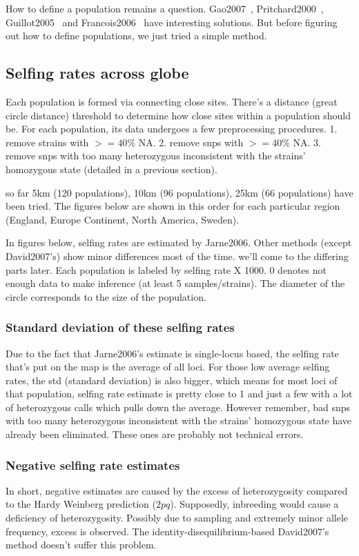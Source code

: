 \documentclass[a4paper,10pt]{article}
\begin{document}
How to define a population remains a question. Gao2007~\cite{Gao2007}, Pritchard2000~\cite{Pritchard2000}, Guillot2005~\cite{Guillot2005} and Francois2006~\cite{Francois2006} have interesting solutions. But before figuring out how to define populations, we just tried a simple method.

\subsection{Selfing rates across globe}
Each population is formed via connecting close sites. There's a distance (great circle distance) threshold to determine how close sites within a population should be. For each population, its data undergoes a few preprocessing procedures. 1. remove strains with $>=40\%$ NA. 2. remove snps with $>=40\%$ NA. 3. remove snps with too many heterozygous inconsistent with the strains' homozygous state (detailed in a previous section).

so far 5km (120 populations), 10km (96 populations), 25km (66 populations) have been tried. The figures below are shown in this order for each particular region (England, Europe Continent, North America, Sweden).

In figures below, selfing rates are estimated by Jarne2006. Other methods (except David2007's) show minor differences most of the time. we'll come to the differing parts later. Each population is labeled by selfing rate X 1000. 0 denotes not enough data to make inference (at least 5 samples/strains). The diameter of the circle corresponds to the size of the population.

\subsubsection{Standard deviation of these selfing rates}

Due to the fact that Jarne2006's estimate is single-locus based, the selfing rate that's put on the map is the average of all loci. For those low average selfing rates, the std (standard deviation) is also bigger, which means for most loci of that population, selfing rate estimate is pretty close to 1 and just a few with a lot of heterozygous calls which pulls down the average. However remember, bad snps with too many heterozygous inconsistent with the strains' homozygous state have already been eliminated. These ones are probably not technical errors.

\subsubsection{Negative selfing rate estimates}
In short, negative estimates are caused by the excess of heterozygosity compared to the Hardy Weinberg prediction ($2pq$). Supposedly, inbreeding would cause a deficiency of heterozygosity. Possibly due to sampling and extremely minor allele frequency, excess is observed. The identity-disequilibrium-based David2007's method doesn't suffer this problem.
\end{document}
